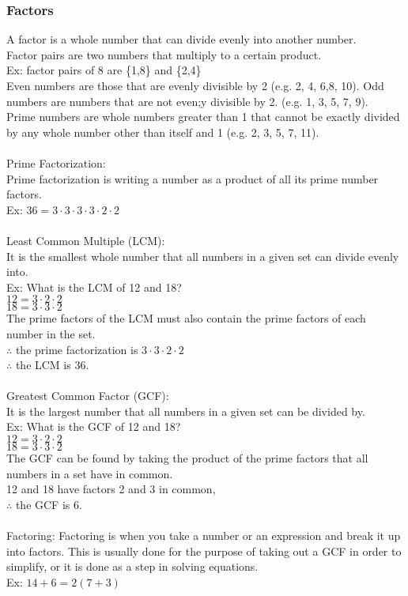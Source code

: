 \subsubsection{Factors}
A factor is a whole number that can divide evenly into another number.\\
Factor pairs are two numbers that multiply to a certain product.\\
Ex: factor pairs of 8 are \{1,8\} and \{2,4\}\\
Even numbers are those that are evenly divisible by 2 (e.g. 2, 4, 6,8, 10). Odd numbers are numbers that are not even;y divisible by 2. (e.g. 1, 3, 5, 7, 9).\\
Prime numbers are whole numbers greater than 1 that cannot be exactly divided by any whole number other than itself and 1 (e.g. 2, 3, 5, 7, 11).\\
\\
Prime Factorization:\\
Prime factorization is writing a number as a product of all its prime number factors.\\
Ex: $36=3\cdot 3\cdot 3\cdot 3\cdot 2\cdot 2$\\
\\
Least Common Multiple (LCM):\\
It is the smallest whole number that all numbers in a given set can divide evenly into.\\
Ex: What is the LCM of 12 and 18?\\
$12=3\cdot 2\cdot 2$\\
$18=3\cdot 3\cdot 2$\\
The prime factors of the LCM must also contain the prime factors of each number in the set.\\
$\therefore $ the prime factorization is $3\cdot 3\cdot 2\cdot 2$\\
$\therefore$ the LCM is 36.\\
\\
Greatest Common Factor (GCF):\\
It is the largest number that all numbers in a given set can be divided by.\\
Ex: What is the GCF of 12 and 18?\\
$12=3\cdot 2\cdot 2$\\
$18=3\cdot 3\cdot 2$\\
The GCF can be found by taking the product of the prime factors that all numbers in a set have in common.\\
12 and 18 have factors 2 and 3 in common,\\
$\therefore$ the GCF is 6.\\
\\
Factoring:
Factoring is when you take a number or an expression and break it up into factors. This is usually done for the purpose of taking out a GCF in order to simplify, or it is done as a step in solving equations.\\
Ex: $14+6=2(7+3)$